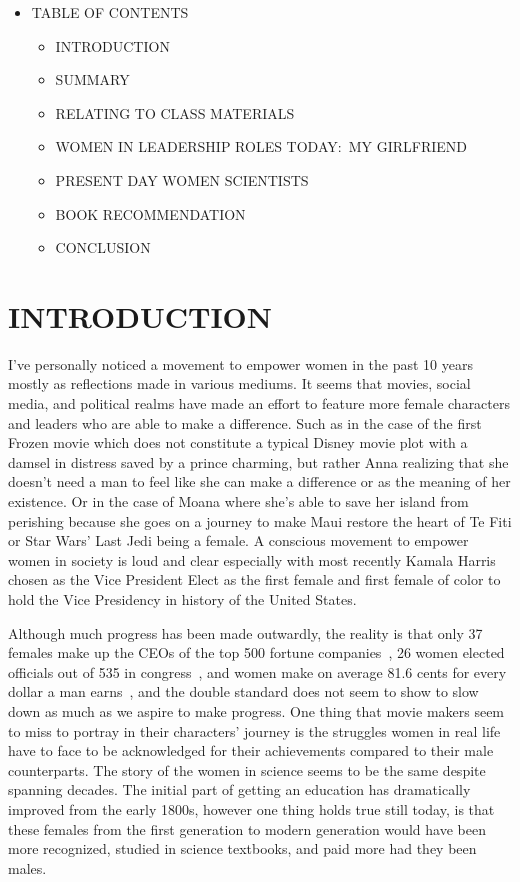 
\par
\begin{itemize}
  \item[] TABLE OF CONTENTS
  \begin{itemize}
    \item INTRODUCTION
    \item SUMMARY
    \item RELATING TO CLASS MATERIALS
    \item WOMEN IN LEADERSHIP ROLES TODAY:\ MY GIRLFRIEND
    \item PRESENT DAY WOMEN SCIENTISTS
    \item BOOK RECOMMENDATION
    \item CONCLUSION
  \end{itemize}
\end{itemize}
\clearpage

\par
\section*{INTRODUCTION}

I’ve personally noticed a movement to empower women in the past 10 years mostly as reflections made in various mediums. It seems that movies, social media, and political realms have made an effort to feature more female characters and leaders who are able to make a difference. Such as in the case of the first Frozen movie which does not constitute a typical Disney movie plot with a damsel in distress saved by a prince charming, but rather Anna realizing that she doesn’t need a man to feel like she can make a difference or as the meaning of her existence. Or in the case of Moana where she’s able to save her island from perishing because she goes on a journey to make Maui restore the heart of Te Fiti or Star Wars’ Last Jedi being a female. A conscious movement to empower women in society is loud and clear especially with most recently Kamala Harris chosen as the Vice President Elect as the first female and first female of color to hold the Vice Presidency in history of the United States.


\par
Although much progress has been made outwardly, the reality is that only 37 females make up the CEOs of the top 500 fortune companies~\cite{fortune}, 26 women elected officials out of 535 in congress~\cite{congress}, and women make on average 81.6 cents for every dollar a man earns~\cite{salary}, and the double standard does not seem to show to slow down as much as we aspire to make progress. One thing that movie makers seem to miss to portray in their characters’ journey is the struggles women in real life have to face to be acknowledged for their achievements compared to their male counterparts. The story of the women in science seems to be the same despite spanning decades. The initial part of getting an education has dramatically improved from the early 1800s, however one thing holds true still today, is that these females from the first generation to modern generation would have been more recognized, studied in science textbooks, and paid more had they been males. 

